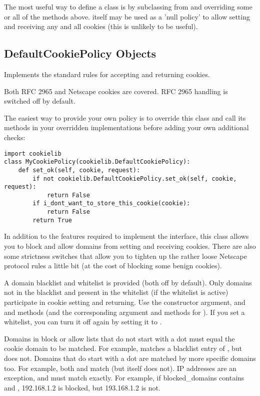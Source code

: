 The most useful way to define a  class is by
subclassing from  and overriding some or
all of the methods above.   itself may be used as
a 'null policy' to allow setting and receiving any and all cookies
(this is unlikely to be useful).


\subsection{DefaultCookiePolicy Objects \label{default-cookie-policy-objects}}

Implements the standard rules for accepting and returning cookies.

Both RFC 2965 and Netscape cookies are covered.  RFC 2965 handling is
switched off by default.

The easiest way to provide your own policy is to override this class
and call its methods in your overridden implementations before adding
your own additional checks:

\begin{verbatim}
import cookielib
class MyCookiePolicy(cookielib.DefaultCookiePolicy):
    def set_ok(self, cookie, request):
        if not cookielib.DefaultCookiePolicy.set_ok(self, cookie, request):
            return False
        if i_dont_want_to_store_this_cookie(cookie):
            return False
        return True
\end{verbatim}

In addition to the features required to implement the
 interface, this class allows you to block and
allow domains from setting and receiving cookies.  There are also some
strictness switches that allow you to tighten up the rather loose
Netscape protocol rules a little bit (at the cost of blocking some
benign cookies).

A domain blacklist and whitelist is provided (both off by default).
Only domains not in the blacklist and present in the whitelist (if the
whitelist is active) participate in cookie setting and returning.  Use
the  constructor argument, and
 and  methods
(and the corresponding argument and methods for
).  If you set a whitelist, you can turn it off
again by setting it to .

Domains in block or allow lists that do not start with a dot must
equal the cookie domain to be matched.  For example,
 matches a blacklist entry of
, but  does not.  Domains
that do start with a dot are matched by more specific domains too.
For example, both  and
 match  (but
 itself does not).  IP addresses are an exception,
and must match exactly.  For example, if blocked_domains contains
 and , 192.168.1.2 is blocked,
but 193.168.1.2 is not.

